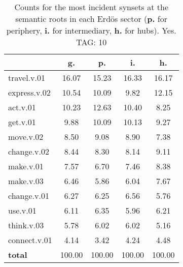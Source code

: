 \begin{table}[h!]
\begin{center}
\begin{tabular}{| l || c | c | c | c |}\hline
 & {\bf g.} & {\bf p.} & {\bf i.} & {\bf h.} \\\hline\hline
travel.v.01 & 16.07  & 15.23  & 16.33  & 16.17 \\\hline
express.v.02 & 10.54  & 10.09  & 9.82  & 12.15 \\\hline
act.v.01 & 10.23  & 12.63  & 10.40  & 8.25 \\\hline
get.v.01 & 9.88  & 10.09  & 10.13  & 9.27 \\\hline
move.v.02 & 8.50  & 9.08  & 8.90  & 7.38 \\\hline
change.v.02 & 8.44  & 8.30  & 8.14  & 9.11 \\\hline
make.v.01 & 7.57  & 6.70  & 7.46  & 8.38 \\\hline
make.v.03 & 6.46  & 5.86  & 6.04  & 7.67 \\\hline
change.v.01 & 6.27  & 6.25  & 6.56  & 5.76 \\\hline
use.v.01 & 6.11  & 6.35  & 5.96  & 6.21 \\\hline
think.v.03 & 5.78  & 6.02  & 6.02  & 5.16 \\\hline
connect.v.01 & 4.14  & 3.42  & 4.24  & 4.48 \\\hline\hline
{{\bf total}} & 100.00  & 100.00  & 100.00  & 100.00 \\\hline
\end{tabular}
\caption{Counts for the most incident synsets at the semantic roots in each Erd\"os sector ({\bf p.} for periphery, {\bf i.} for intermediary, {\bf h.} for hubs). Yes. TAG: 10}
\end{center}
\end{table}